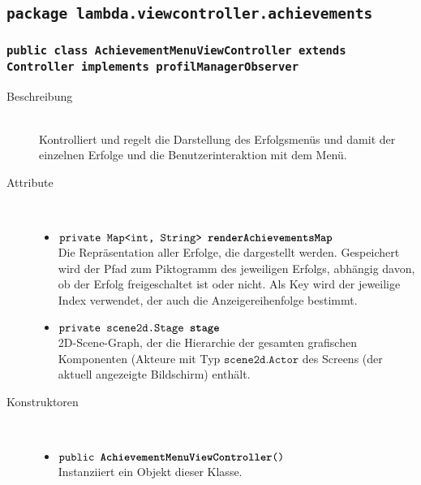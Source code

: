 \subsection{\texttt{package lambda.viewcontroller.achievements}}

\subsubsection{\normalfont \texttt{public class \textbf{AchievementMenuViewController} extends Controller implements profilManagerObserver}}

\begin{description}
\item[Beschreibung] \hfill \\ Kontrolliert und regelt die Darstellung des Erfolgsmenüs und damit der einzelnen Erfolge und die Benutzerinteraktion mit dem Menü.
\item[Attribute] \hfill \\
	\vspace{-.8cm}
	\begin{itemize}
		\item $\texttt{private Map<int, String> \textbf{renderAchievementsMap}}$ \\ Die Repräsentation aller Erfolge, die dargestellt werden. Gespeichert wird der Pfad zum Piktogramm des jeweiligen Erfolgs, abhängig davon, ob der Erfolg freigeschaltet ist oder nicht. Als Key wird der jeweilige Index verwendet, der auch die Anzeigereihenfolge bestimmt.
		\item $\texttt{private scene2d.Stage \textbf{stage}}$ \\ 2D-Scene-Graph, der die Hierarchie der gesamten grafischen Komponenten (Akteure mit Typ $\texttt{scene2d.Actor}$ des Screens (der aktuell angezeigte Bildschirm) enthält. 
		\end{itemize}
\item[Konstruktoren] \hfill \\
	\vspace{-.8cm}
	\begin{itemize}
		\item $\texttt{public \textbf{AchievementMenuViewController}()}$ \\ Instanziiert ein Objekt dieser Klasse.
	\end{itemize}
	

\end{description}
